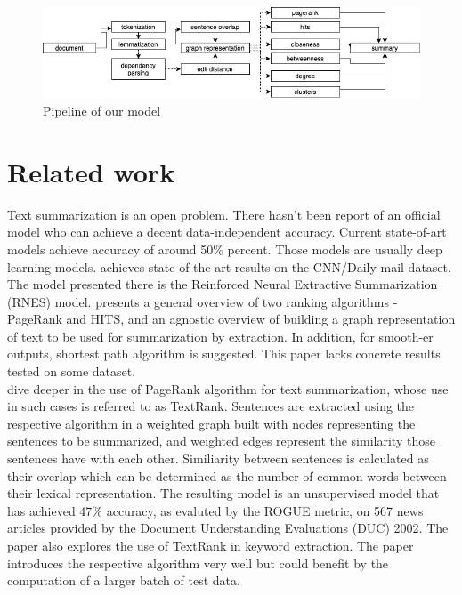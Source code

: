 \documentclass[9pt,twocolumn,twoside]{pnas-report}
\begin{document}
\begin{figure}[t]\centering%
	\includegraphics[width=1\linewidth]{pipeline.png}
	\caption{Pipeline of our model}
	\label{fig:pipeline}
\end{figure}

\section*{Related work}
Text summarization is an open problem. There hasn't been report of an official model who can achieve a decent data-independent accuracy. Current state-of-art models achieve accuracy of around 50\% percent. Those models are usually deep learning models. \cite{YW} achieves state-of-the-art results on the CNN/Daily mail dataset. The model presented there is the Reinforced Neural Extractive Summarization (RNES) model. \cite{TSK} presents a general overview of two ranking algorithms - PageRank and HITS, and an agnostic overview of building a graph representation of text to be used for summarization by extraction. In addition, for smooth-er outputs, shortest path algorithm is suggested. This paper lacks concrete results tested on some dataset. \\
\cite{MH, MCH} dive deeper in the use of PageRank algorithm for text summarization, whose use in such cases is referred to as TextRank. 
Sentences are extracted using the respective algorithm in a weighted graph built with nodes representing the sentences to be summarized, and weighted edges represent the similarity those sentences have with each other. Similiarity between sentences is calculated as their overlap which can be determined as the number of common words between their lexical representation. The resulting model is an unsupervised model that has achieved 47\% accuracy, as evaluted by the ROGUE metric, on 567 news articles provided by the Document Understanding Evaluations (DUC) 2002. The paper also explores the use of TextRank in keyword extraction. The paper introduces the respective algorithm very well but could benefit by the computation of a larger batch of test data. \\
\end{document}
